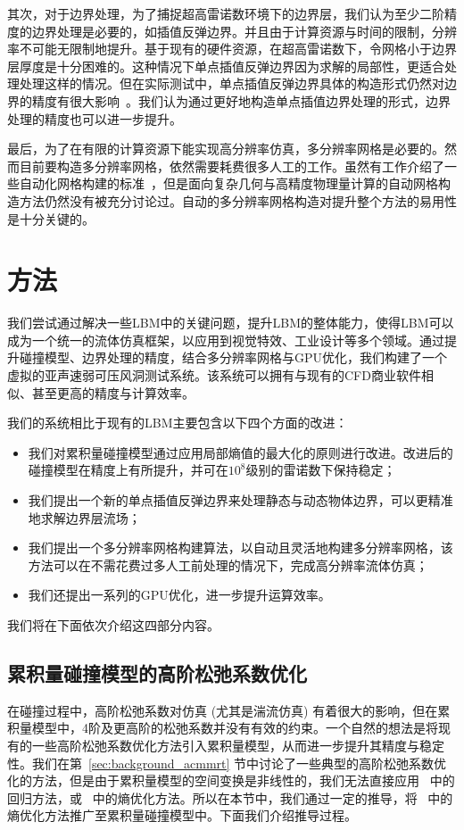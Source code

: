 其次，对于边界处理，为了捕捉超高雷诺数环境下的边界层，我们认为至少二阶精度的边界处理是必要的，如插值反弹边界。并且由于计算资源与时间的限制，分辨率不可能无限制地提升。基于现有的硬件资源，在超高雷诺数下，令网格小于边界层厚度是十分困难的。这种情况下单点插值反弹边界因为求解的局部性，更适合处理处理这样的情况。但在实际测试中，单点插值反弹边界具体的构造形式仍然对边界的精度有很大影响~\citep{Chen-2021-b}。我们认为通过更好地构造单点插值边界处理的形式，边界处理的精度也可以进一步提升。

最后，为了在有限的计算资源下能实现高分辨率仿真，多分辨率网格是必要的。然而目前要构造多分辨率网格，依然需要耗费很多人工的工作。虽然有工作介绍了一些自动化网格构建的标准~\citep{THORIMBERT2022101864}，但是面向复杂几何与高精度物理量计算的自动网格构造方法仍然没有被充分讨论过。自动的多分辨率网格构造对提升整个方法的易用性是十分关键的。

\section{方法}
我们尝试通过解决一些LBM中的关键问题，提升LBM的整体能力，使得LBM可以成为一个统一的流体仿真框架，以应用到视觉特效、工业设计等多个领域。通过提升碰撞模型、边界处理的精度，结合多分辨率网格与GPU优化，我们构建了一个虚拟的亚声速弱可压风洞测试系统。该系统可以拥有与现有的CFD商业软件相似、甚至更高的精度与计算效率。

我们的系统相比于现有的LBM主要包含以下四个方面的改进：
\begin{itemize}
	\item 我们对累积量碰撞模型通过应用局部熵值的最大化的原则进行改进。改进后的碰撞模型在精度上有所提升，并可在$10^8$级别的雷诺数下保持稳定； 
	\item 我们提出一个新的单点插值反弹边界来处理静态与动态物体边界，可以更精准地求解边界层流场；
	\item 我们提出一个多分辨率网格构建算法，以自动且灵活地构建多分辨率网格，该方法可以在不需花费过多人工前处理的情况下，完成高分辨率流体仿真；
	\item 我们还提出一系列的GPU优化，进一步提升运算效率。
\end{itemize}

我们将在下面依次介绍这四部分内容。

\subsection{累积量碰撞模型的高阶松弛系数优化}
\label{sec:collision_sig23}
在碰撞过程中，高阶松弛系数对仿真 (尤其是湍流仿真) 有着很大的影响，但在累积量模型中，4阶及更高阶的松弛系数并没有有效的约束。一个自然的想法是将现有的一些高阶松弛系数优化方法引入累积量模型，从而进一步提升其精度与稳定性。我们在第~\ref{sec:background_acmmrt} 节中讨论了一些典型的高阶松弛系数优化的方法，但是由于累积量模型的空间变换是非线性的，我们无法直接应用~\citep{Li-2020} 中的回归方法，或~\citep{Kramer-2019} 中的熵优化方法。所以在本节中，我们通过一定的推导，将~\citep{Kramer-2019} 中的熵优化方法推广至累积量碰撞模型中。下面我们介绍推导过程。

